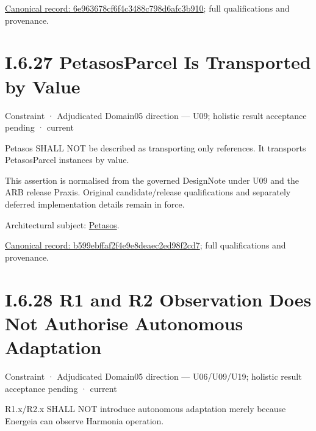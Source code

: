 {\footnotesize \href{../../../../../../../../continuum/motivation/constraint/6e963678cf6f4c3488c798d6afc3b910.md}{Canonical record: 6e963678cf6f4c3488c798d6afc3b910}; full qualifications and provenance.}\par
\section*{I.6.27 PetasosParcel Is Transported by Value}
\label{navigation:I.6.27}

\label{element:b599ebffaf2f4e9e8deaec2ed98f2cd7}
{\small Constraint · Adjudicated Domain05 direction — U09; holistic result acceptance pending · current}\par

Petasos SHALL NOT be described as transporting only references. It transports PetasosParcel instances by value.



This assertion is normalised from the governed DesignNote under U09 and the ARB release Praxis. Original candidate/release qualifications and separately deferred implementation details remain in force.



Architectural subject: \hyperref[element:195e5f10db8e419391354197b5d7a8cc]{Petasos}.


{\footnotesize \href{../../../../../../../../continuum/motivation/constraint/b599ebffaf2f4e9e8deaec2ed98f2cd7.md}{Canonical record: b599ebffaf2f4e9e8deaec2ed98f2cd7}; full qualifications and provenance.}\par
\section*{I.6.28 R1 and R2 Observation Does Not Authorise Autonomous Adaptation}
\label{navigation:I.6.28}

\label{element:7ca8481aa04a4dfdb34766511e002a5b}
{\small Constraint · Adjudicated Domain05 direction — U06/U09/U19; holistic result acceptance pending · current}\par

R1.x/R2.x SHALL NOT introduce autonomous adaptation merely because Energeia can observe Harmonia operation.



